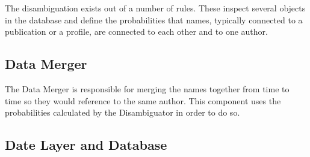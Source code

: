 The disambiguation exists out of a number of rules. These inspect several objects in the database and define the probabilities that names, typically connected to a publication or a profile, are connected to each other and to one author.

\subsection{Data Merger}

The Data Merger is responsible for merging the names together from time to time so they would reference to the same author. This component uses the probabilities calculated by the Disambiguator in order to do so.

\subsection{Date Layer and Database}

